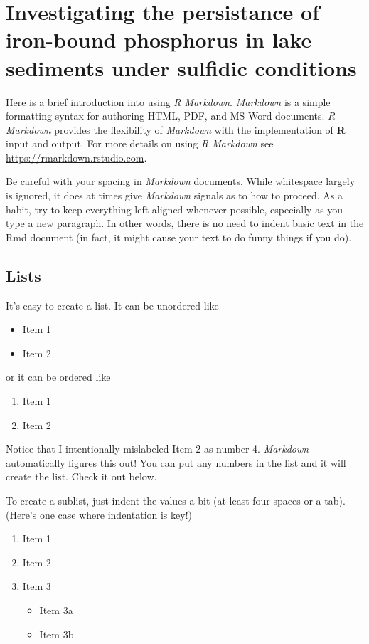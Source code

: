 \documentclass[12pt,twoside]{book}
\providecommand{\tightlist}{%
  \setlength{\itemsep}{0pt}\setlength{\parskip}{0pt}}
\begin{document}
\chapter{Investigating the persistance of iron-bound phosphorus in lake sediments under sulfidic conditions}\label{Aarhus}

Here is a brief introduction into using \emph{R Markdown}. \emph{Markdown} is a simple formatting syntax for authoring HTML, PDF, and MS Word documents. \emph{R Markdown} provides the flexibility of \emph{Markdown} with the implementation of \textbf{R} input and output. For more details on using \emph{R Markdown} see \url{https://rmarkdown.rstudio.com}.

Be careful with your spacing in \emph{Markdown} documents. While whitespace largely is ignored, it does at times give \emph{Markdown} signals as to how to proceed. As a habit, try to keep everything left aligned whenever possible, especially as you type a new paragraph. In other words, there is no need to indent basic text in the Rmd document (in fact, it might cause your text to do funny things if you do).

\section{Lists}\label{lists}

It's easy to create a list. It can be unordered like

\begin{itemize}
\tightlist
\item
  Item 1
\item
  Item 2
\end{itemize}

or it can be ordered like

\begin{enumerate}
\def\labelenumi{\arabic{enumi}.}
\tightlist
\item
  Item 1
\item
  Item 2
\end{enumerate}

Notice that I intentionally mislabeled Item 2 as number 4. \emph{Markdown} automatically figures this out! You can put any numbers in the list and it will create the list. Check it out below.

To create a sublist, just indent the values a bit (at least four spaces or a tab). (Here's one case where indentation is key!)

\begin{enumerate}
\def\labelenumi{\arabic{enumi}.}
\tightlist
\item
  Item 1
\item
  Item 2
\item
  Item 3

  \begin{itemize}
  \tightlist
  \item
    Item 3a
  \item
    Item 3b
  \end{itemize}
\end{enumerate}
\end{document}
